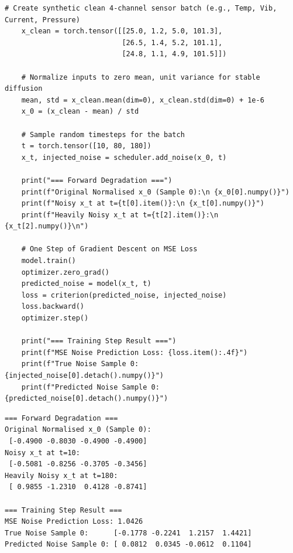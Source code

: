 \begin{lstlisting}[style=pythonstyle, caption={Implementation of a DDPM linear noise scheduler and toy 1D denoising model in PyTorch.}, label={lst:diffusion_ddpm}]
    # Create synthetic clean 4-channel sensor batch (e.g., Temp, Vib, Current, Pressure)
    x_clean = torch.tensor([[25.0, 1.2, 5.0, 101.3],
                            [26.5, 1.4, 5.2, 101.1],
                            [24.8, 1.1, 4.9, 101.5]])
    
    # Normalize inputs to zero mean, unit variance for stable diffusion
    mean, std = x_clean.mean(dim=0), x_clean.std(dim=0) + 1e-6
    x_0 = (x_clean - mean) / std

    # Sample random timesteps for the batch
    t = torch.tensor([10, 80, 180])
    x_t, injected_noise = scheduler.add_noise(x_0, t)

    print("=== Forward Degradation ===")
    print(f"Original Normalised x_0 (Sample 0):\n {x_0[0].numpy()}")
    print(f"Noisy x_t at t={t[0].item()}:\n {x_t[0].numpy()}")
    print(f"Heavily Noisy x_t at t={t[2].item()}:\n {x_t[2].numpy()}\n")

    # One Step of Gradient Descent on MSE Loss
    model.train()
    optimizer.zero_grad()
    predicted_noise = model(x_t, t)
    loss = criterion(predicted_noise, injected_noise)
    loss.backward()
    optimizer.step()

    print("=== Training Step Result ===")
    print(f"MSE Noise Prediction Loss: {loss.item():.4f}")
    print(f"True Noise Sample 0:      {injected_noise[0].detach().numpy()}")
    print(f"Predicted Noise Sample 0: {predicted_noise[0].detach().numpy()}")
\end{lstlisting}

\begin{lstlisting}[style=outputstyle, caption={Output of the PyTorch linear diffusion and denoising script.}]
=== Forward Degradation ===
Original Normalised x_0 (Sample 0):
 [-0.4900 -0.8030 -0.4900 -0.4900]
Noisy x_t at t=10:
 [-0.5081 -0.8256 -0.3705 -0.3456]
Heavily Noisy x_t at t=180:
 [ 0.9855 -1.2310  0.4128 -0.8741]

=== Training Step Result ===
MSE Noise Prediction Loss: 1.0426
True Noise Sample 0:      [-0.1778 -0.2241  1.2157  1.4421]
Predicted Noise Sample 0: [ 0.0812  0.0345 -0.0612  0.1104]
\end{lstlisting}


